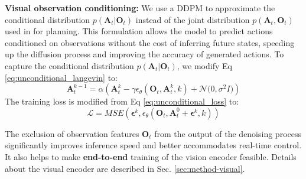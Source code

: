 \textbf{Visual observation conditioning:}
We use a DDPM to approximate the conditional distribution $p(\mathbf{A}_t | \mathbf{O}_t)$ instead of the joint distribution $p(\mathbf{A}_t,\mathbf{O}_t)$ used in \citet{janner2022diffuser} for planning. This formulation allows the model to predict actions conditioned on observations without the cost of inferring future states, speeding up the diffusion process and improving the accuracy of generated actions.
To capture the conditional distribution $p(\mathbf{A}_t |\mathbf{O}_t)$, we modify Eq \ref{eq:unconditional_langevin} to:
\begin{equation}
    \label{eq:diffusion_policy_langevin}
    \mathbf{A}^{k-1}_t = \alpha(\mathbf{A}^k_t - \gamma\epsilon_\theta(\mathbf{O}_t,\mathbf{A}^k_t,k) + \mathcal{N} \bigl(0, \sigma^2 I \bigl))
\end{equation}
The training loss is modified from Eq \ref{eq:unconditional_loss} to:
\begin{equation}
    \label{eq:diffusion_policy_loss}
    \mathcal{L}=MSE(\mathbf{\epsilon}^k,\epsilon_\theta(\mathbf{O}_t, \mathbf{A}^0_t + \mathbf{\epsilon}^k, k))
\end{equation}

The exclusion of observation features $\mathbf{O}_t$ from the output of the denoising process significantly improves inference speed and better accommodates real-time control. It also helps to make \textbf{end-to-end} training of the vision encoder feasible.
Details about the visual encoder are described in Sec. \ref{sec:method-visual}.



